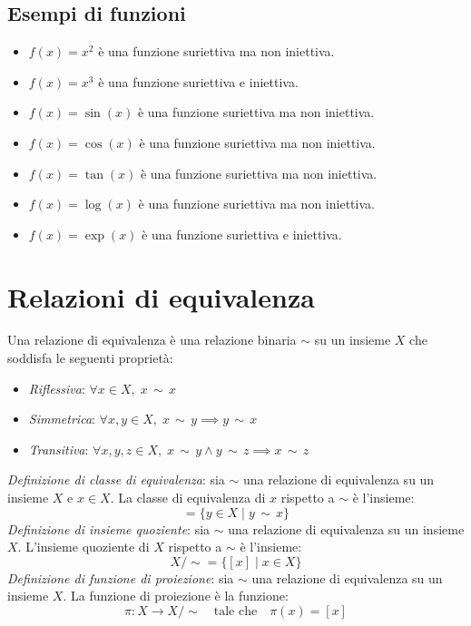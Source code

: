 \subsection{Esempi di funzioni}
    \begin{itemize}
        \item $f(x)=x^2$ è una funzione suriettiva ma non iniettiva.
        \item $f(x)=x^3$ è una funzione suriettiva e iniettiva.
        \item $f(x)=\sin(x)$ è una funzione suriettiva ma non iniettiva.
        \item $f(x)=\cos(x)$ è una funzione suriettiva ma non iniettiva.
        \item $f(x)=\tan(x)$ è una funzione suriettiva ma non iniettiva.
        \item $f(x)=\log(x)$ è una funzione suriettiva ma non iniettiva.
        \item $f(x)=\exp(x)$ è una funzione suriettiva e iniettiva.
    \end{itemize}
\section{Relazioni di equivalenza}
    \label{sec:Relazioni_di_equivalenza} 
    Una relazione di equivalenza è una relazione binaria $\sim$ su un insieme $X$ che soddisfa le seguenti proprietà:
    \begin{itemize}
        \item \emph{Riflessiva}: $\forall x \in X, \; x \, \sim \, x$
        \item \emph{Simmetrica}: $\forall x, y \in X, \; x \, \sim \, y \implies y \, \sim \, x$
        \item \emph{Transitiva}: $\forall x, y, z \in X, \; x \, \sim \, y \land y \, \sim \, z \implies x \, \sim \, z$
    \end{itemize}
    \emph{Definizione di classe di equivalenza}: sia $\sim$ una relazione di equivalenza su un insieme $X$ e $x \in X$. La classe di equivalenza di $x$ rispetto a $\sim$ è l'insieme:
    \begin{equation}
        [x] = \{y \in X \; | \; y \, \sim \, x\}   
    \end{equation}
    \emph{Definizione di insieme quoziente}: sia $\sim$ una relazione di equivalenza su un insieme $X$. L'insieme quoziente di $X$ rispetto a $\sim$ è l'insieme:
    \begin{equation}
        X/\sim = \{[x] \; | \; x \in X\}
    \end{equation}
    \emph{Definizione di funzione di proiezione}: sia $\sim$ una relazione di equivalenza su un insieme $X$. La funzione di proiezione è la funzione:
    \begin{equation}
        \pi: X \to X/\sim \quad \text{tale che} \quad \pi(x) = [x]
    \end{equation}
    